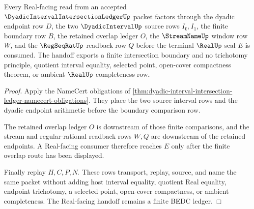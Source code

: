\begin{theorem}
\label{thm:dyadic-interval-intersection-ledger-real-seal}
Every Real-facing read from an accepted $\DyadicIntervalIntersectionLedgerUp$ packet factors through the dyadic endpoint row $D$, the two $\DyadicIntervalUp$ source rows $I_0,I_1$, the finite boundary row $B$, the retained overlap ledger $O$, the $\StreamNameUp$ window row $W$, and the $\RegSeqRatUp$ readback row $Q$ before the terminal $\RealUp$ seal $E$ is consumed. The handoff exports a finite intersection boundary and no trichotomy principle, quotient interval equality, selected point, open-cover compactness theorem, or ambient $\RealUp$ completeness row.
\end{theorem}
\begin{proof}
Apply the NameCert obligations of \autoref{thm:dyadic-interval-intersection-ledger-namecert-obligations}. They place the two source interval rows and the dyadic endpoint arithmetic before the boundary comparison row.

The retained overlap ledger $O$ is downstream of those finite comparisons, and the stream and regular-rational readback rows $W,Q$ are downstream of the retained endpoints. A Real-facing consumer therefore reaches $E$ only after the finite overlap route has been displayed.

Finally replay $H,C,P,N$. These rows transport, replay, source, and name the same packet without adding host interval equality, quotient Real equality, endpoint trichotomy, a selected point, open-cover compactness, or ambient completeness. The Real-facing handoff remains a finite BEDC ledger.
\end{proof}



